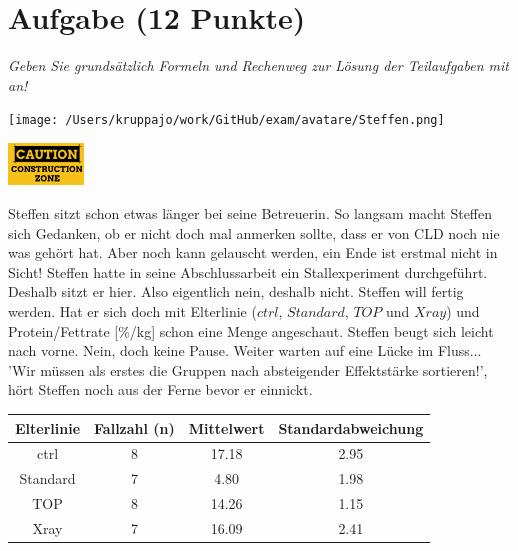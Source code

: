 \documentclass[a4paper, 9pt]{scrartcl}\usepackage[]{graphicx}\usepackage[]{xcolor}
\newenvironment{knitrout}{}{} %
\begin{document}
 
\clearpage

\section{Aufgabe \hfill (12 Punkte)}

\textit{Geben Sie grundsätzlich Formeln und Rechenweg zur Lösung der Teilaufgaben mit an!} \\[1Ex]
 

 
\begin{minipage}[t]{0.5\textwidth}
\texttt{[image: /Users/kruppajo/work/GitHub/exam/avatare/Steffen.png]}
\end{minipage}
\begin{minipage}[t]{0.5\textwidth}
\hfill
\href{https://youtu.be/RagTFFKFbFg}{\includegraphics[width = 2cm]{img/caution}}
\end{minipage}
\vspace{1ex}



Steffen sitzt schon etwas länger bei seine Betreuerin. So langsam macht Steffen sich Gedanken, ob er nicht doch mal anmerken sollte, dass er von CLD noch nie was gehört hat. Aber noch kann gelauscht werden, ein Ende ist erstmal nicht in Sicht! Steffen hatte in seine Abschlussarbeit ein Stallexperiment durchgeführt. Deshalb sitzt er hier. Also eigentlich nein, deshalb nicht. Steffen will fertig werden. Hat er sich doch mit Elterlinie ($ctrl$, $Standard$, $TOP$ und $Xray$) und Protein/Fettrate [\%/kg] schon eine Menge angeschaut. Steffen beugt sich leicht nach vorne. Nein, doch keine Pause. Weiter warten auf eine Lücke im Fluss... 'Wir müssen als erstes die Gruppen nach absteigender Effektstärke sortieren!', hört Steffen noch aus der Ferne bevor er einnickt.

\begin{knitrout}
\color{fgcolor}\begin{table}[!h]
\centering\begingroup\fontsize{10}{12}\selectfont

\begin{tabular}{cccc}
\toprule
\textbf{Elterlinie} & \textbf{Fallzahl (n)} & \textbf{Mittelwert} & \textbf{Standardabweichung}\\
\midrule
ctrl & 8 & 17.18 & 2.95\\
Standard & 7 & 4.80 & 1.98\\
TOP & 8 & 14.26 & 1.15\\
Xray & 7 & 16.09 & 2.41\\
\bottomrule
\end{tabular}
\endgroup{}
\end{table}

\end{knitrout}
\end{document}
